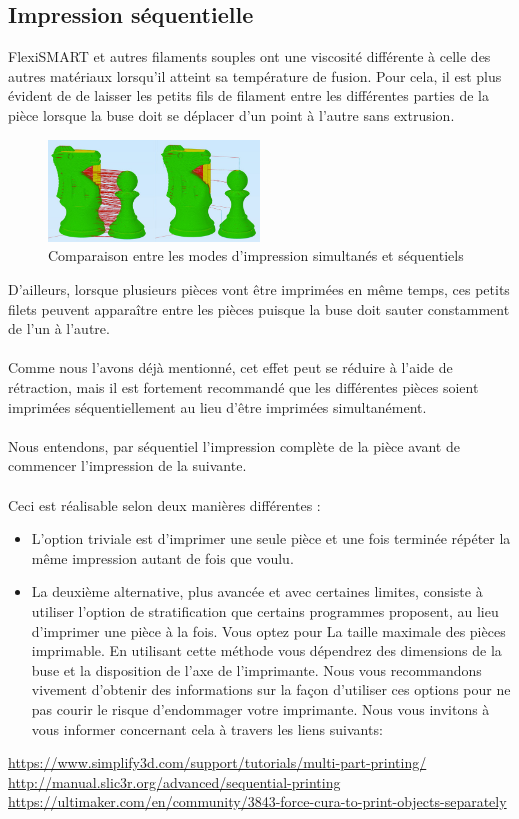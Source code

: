 \documentclass[11pt,a4paper]{article}
\begin{document}
	\subsection{Impression séquentielle}
FlexiSMART et autres filaments souples ont une viscosité différente à celle des autres matériaux lorsqu’il atteint sa température de fusion. Pour cela, il est plus évident de de laisser les petits fils de filament entre les différentes parties de la pièce lorsque la buse doit se déplacer d’un point à l’autre sans extrusion.
\begin{figure}[H]
\centering
\includegraphics[width=0.5\textwidth,cfbox=azul_marcos 4pt 0pt]{FOTOS/SEQUENTIALPRINTING}
\caption*{Comparaison entre les modes d'impression simultanés et séquentiels}
\end{figure}
D’ailleurs, lorsque plusieurs pièces vont être imprimées en même temps, ces petits filets peuvent apparaître entre les pièces puisque la buse doit sauter constamment de l'un à l'autre.
\\\\
Comme nous l'avons déjà mentionné, cet effet peut se réduire à l’aide de rétraction, mais il est fortement recommandé que les différentes pièces soient imprimées séquentiellement au lieu d’être imprimées simultanément.
\\\\
Nous entendons, par séquentiel l’impression complète de la pièce avant de commencer l’impression de la suivante.
\\\\
Ceci est réalisable selon deux manières différentes :
\begin{itemize}
\item L'option triviale est d'imprimer une seule pièce et une fois terminée répéter la même impression autant de fois que voulu.
\item La deuxième alternative, plus avancée et avec certaines limites, consiste à utiliser l'option de stratification que certains programmes proposent, au lieu d'imprimer une pièce à la fois. Vous optez pour La taille maximale des pièces imprimable. En utilisant cette méthode vous dépendrez des dimensions de la buse et la disposition de l'axe de l'imprimante. Nous vous recommandons vivement d'obtenir des informations sur la façon d’utiliser ces options pour ne pas courir le risque d’endommager votre imprimante. Nous vous invitons à vous informer concernant cela à travers les liens suivants:
\end{itemize}
\url{https://www.simplify3d.com/support/tutorials/multi-part-printing/}\\
\url{http://manual.slic3r.org/advanced/sequential-printing}\\
\url{https://ultimaker.com/en/community/3843-force-cura-to-print-objects-separately}
\end{document}
